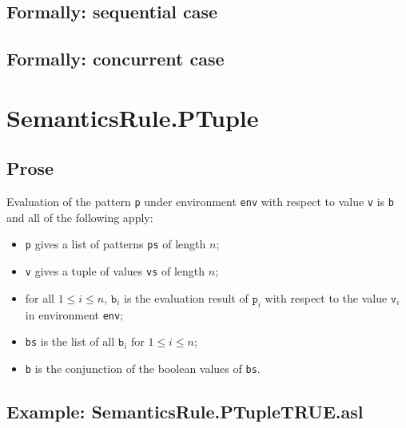 \documentclass{book}
\begin{document}
\begin{emptyformal}
  \subsection{Formally: sequential case}

  \subsection{Formally: concurrent case}
\end{emptyformal}


\section{SemanticsRule.PTuple \label{sec:SemanticsRule.PTuple}}

    \subsection{Prose}
    Evaluation of the pattern \texttt{p} under environment \texttt{env} with
    respect to value \texttt{v} is \texttt{b} and all of the following apply:
    \begin{itemize}
      \item \texttt{p} gives a list of patterns \texttt{ps} of length $n$;
      \item \texttt{v} gives a tuple of values \texttt{vs} of length $n$;
      \item for all $1 \leq i \leq n$, $\texttt{b}_i$ is the evaluation result
        of $\texttt{p}_i$ with respect to the value $\texttt{v}_i$ in
        environment \texttt{env};
      \item \texttt{bs} is the list of all $\texttt{b}_i$ for $1 \leq i \leq n$;
      \item \texttt{b} is the conjunction of the boolean values of \texttt{bs}.
    \end{itemize}

    \subsection{Example: SemanticsRule.PTupleTRUE.asl}
\end{document}
